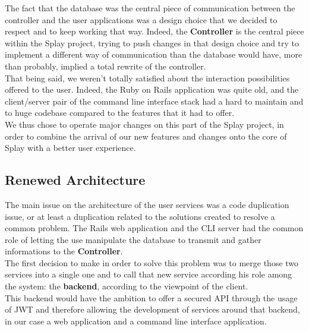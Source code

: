 \documentclass{eplmastersthesis}
\begin{document}
        The fact that the database was the central piece of communication
        between the controller and the user applications was a design choice
        that we decided to respect and to keep working that way. Indeed, the
        \textbf{Controller} is the central piece within the Splay project,
        trying to push changes in that design choice and try to implement a
        different way of communication than the database would have, more
        than probably, implied a total rewrite of the controller.\\

        That being said, we weren't totally satisfied about the interaction
        possibilities offered to the user. Indeed, the Ruby on Rails application
        was quite old, and the client/server pair of the command line interface
        stack had a hard to maintain and to huge codebase compared to the
        features that it had to offer.\\

        We thus chose to operate major changes on this part of the Splay
        project, in order to combine the arrival of our new features and
        changes onto the core of Splay with a better user experience.

      \subsection{Renewed Architecture}

        The main issue on the architecture of the user services was a code
        duplication issue, or at least a duplication related to the solutions
        created to resolve a common problem. The Rails web application and the
        CLI server had the common role of letting the use manipulate the
        database to transmit and gather informations to the \textbf{Controller}.\\

        The first decision to make in order to solve this problem was to
        merge those two services into a single one and to call that new
        service according his role among the system: the \textbf{backend},
        according to the viewpoint of the client.\\
        This backend would have the ambition to offer a secured API through
        the usage of JWT \cite{JWT} and therefore allowing the development
        of services around that backend, in our case a web application and
        a command line interface application.\\
\end{document}
